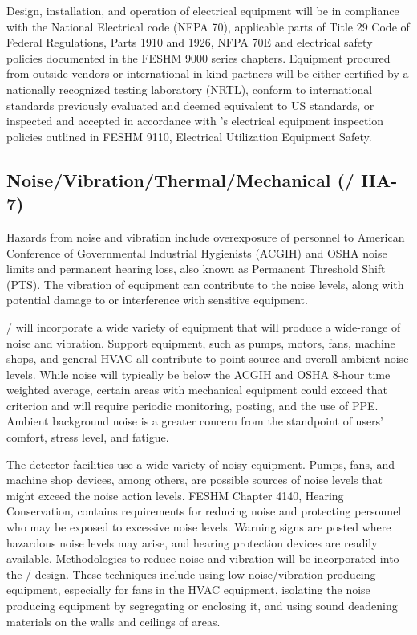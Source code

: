 Design, installation, and operation of electrical equipment will be in
compliance with the National Electrical code (NFPA 70), applicable
parts of Title 29 Code of Federal Regulations, Parts 1910 and 1926,
NFPA 70E and \fnal electrical safety policies documented in the
FESHM 9000 series chapters. Equipment procured from outside vendors or
international in-kind partners will be either certified by a
nationally recognized testing laboratory (NRTL), conform to
international standards previously evaluated and deemed equivalent to
US standards, or inspected and accepted in accordance with \fnal's
electrical equipment inspection policies outlined in FESHM 9110,
Electrical Utilization Equipment Safety.


\subsection{Noise/Vibration/Thermal/Mechanical (/ HA-7)}

Hazards from noise and vibration include overexposure of personnel to
American Conference of Governmental Industrial Hygienists (ACGIH) and
OSHA noise limits and permanent hearing loss, also known as Permanent
Threshold Shift (PTS). The vibration of equipment can contribute to
the noise levels, along with potential damage to or interference with
sensitive equipment.

/ will incorporate a wide variety of equipment that will
produce a wide-range of noise and vibration. Support equipment, such
as pumps, motors, fans, machine shops, and general HVAC all contribute
to point source and overall ambient noise levels. While noise will
typically be below the ACGIH and OSHA 8-hour time weighted average,
certain areas with mechanical equipment could exceed that criterion
and will require periodic monitoring, posting, and the use of
PPE. Ambient background noise is a greater concern from the standpoint
of users' comfort, stress level, and fatigue.

The detector facilities use a wide variety of noisy equipment. Pumps,
fans, and machine shop devices, among others, are possible sources of
noise levels that might exceed the \fnal noise action levels. FESHM
Chapter 4140, Hearing Conservation, contains requirements for reducing
noise and protecting personnel who may be exposed to excessive noise
levels. Warning signs are posted where hazardous noise levels may
arise, and hearing protection devices are readily
available. Methodologies to reduce noise and vibration will be
incorporated into the / design. These techniques include using
low noise/vibration producing equipment, especially for fans in the
HVAC equipment, isolating the noise producing equipment by segregating
or enclosing it, and using sound deadening materials on the walls and
ceilings of areas.


